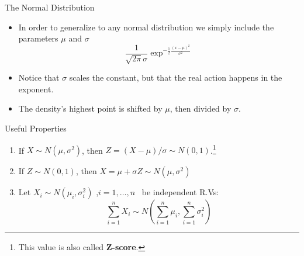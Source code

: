 \documentclass[handout]{beamer}
\begin{document}
\begin{frame}{The  Normal Distribution}

\scriptsize{
\begin{itemize}
 \item In order to generalize to any normal distribution we simply include the parameters $\mu$ and $\sigma$
 \begin{displaymath}
 \frac{1}{\sqrt{2\pi}\sigma}\exp^{-\frac{1}{2}\frac{(x-\mu)^2}{\sigma^{2}}} 
 \end{displaymath}
 \item Notice that $\sigma$ scales the constant, but that the real action happens in the exponent. 
 \item The density's highest point is shifted by $\mu$, then divided by $\sigma$. 
\end{itemize}

\begin{block}{Useful Properties}
\begin{enumerate}
 \item If $X \sim N(\mu, \sigma^2)$, then $Z=(X-\mu)/\sigma \sim N(0,1)$.\footnote{This value is also called \textbf{Z-score}.}
 \item If $Z \sim N(0,1)$, then $X=\mu+\sigma Z \sim N(\mu, \sigma^2)$
 \item Let $X_{i} \sim N(\mu_{i},\sigma_{i}^{2})$ ,$i=1,\dots,n$ \  be independent R.Vs:
 \begin{displaymath}
  \sum_{i=1}^{n}X_{i}\sim N( \sum_{i=1}^{n}\mu_{i}, \sum_{i=1}^{n}\sigma_{i}^{2})
 \end{displaymath}

 
\end{enumerate}
 
\end{block}
}
\end{frame}
\end{document}
